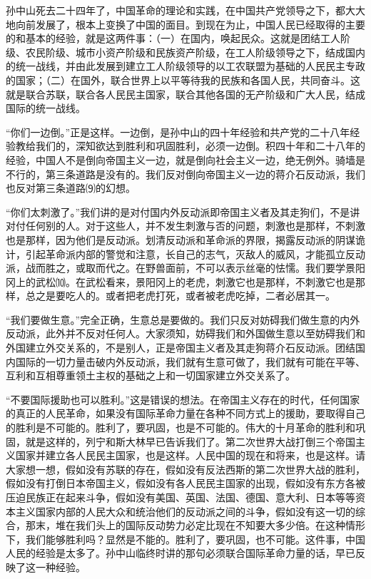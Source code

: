 \documentclass[UTF-8, a5paper, 12pt]{ctexart}
\begin{document}
孙中山死去二十四年了，中国革命的理论和实践，在中国共产党领导之下，都大大地向前发展了，根本上变换了中国的面目。到现在为止，中国人民已经取得的主要的和基本的经验，就是这两件事：（一）在国内，唤起民众。这就是团结工人阶级、农民阶级、城市小资产阶级和民族资产阶级，在工人阶级领导之下，结成国内的统一战线，并由此发展到建立工人阶级领导的以工农联盟为基础的人民民主专政的国家；（二）在国外，联合世界上以平等待我的民族和各国人民，共同奋斗。这就是联合苏联，联合各人民民主国家，联合其他各国的无产阶级和广大人民，结成国际的统一战线。

“你们一边倒。”正是这样。一边倒，是孙中山的四十年经验和共产党的二十八年经验教给我们的，深知欲达到胜利和巩固胜利，必须一边倒。积四十年和二十八年的经验，中国人不是倒向帝国主义一边，就是倒向社会主义一边，绝无例外。骑墙是不行的，第三条道路是没有的。我们反对倒向帝国主义一边的蒋介石反动派，我们也反对第三条道路⑼的幻想。

“你们太刺激了。”我们讲的是对付国内外反动派即帝国主义者及其走狗们，不是讲对付任何别的人。对于这些人，并不发生刺激与否的问题，刺激也是那样，不刺激也是那样，因为他们是反动派。划清反动派和革命派的界限，揭露反动派的阴谋诡计，引起革命派内部的警觉和注意，长自己的志气，灭敌人的威风，才能孤立反动派，战而胜之，或取而代之。在野兽面前，不可以表示丝毫的怯懦。我们要学景阳冈上的武松⑽。在武松看来，景阳冈上的老虎，刺激它也是那样，不刺激它也是那样，总之是要吃人的。或者把老虎打死，或者被老虎吃掉，二者必居其一。

“我们要做生意。”完全正确，生意总是要做的。我们只反对妨碍我们做生意的内外反动派，此外并不反对任何人。大家须知，妨碍我们和外国做生意以至妨碍我们和外国建立外交关系的，不是别人，正是帝国主义者及其走狗蒋介石反动派。团结国内国际的一切力量击破内外反动派，我们就有生意可做了，我们就有可能在平等、互利和互相尊重领土主权的基础之上和一切国家建立外交关系了。

“不要国际援助也可以胜利。”这是错误的想法。在帝国主义存在的时代，任何国家的真正的人民革命，如果没有国际革命力量在各种不同方式上的援助，要取得自己的胜利是不可能的。胜利了，要巩固，也是不可能的。伟大的十月革命的胜利和巩固，就是这样的，列宁和斯大林早已告诉我们了。第二次世界大战打倒三个帝国主义国家并建立各人民民主国家，也是这样。人民中国的现在和将来，也是这样。请大家想一想，假如没有苏联的存在，假如没有反法西斯的第二次世界大战的胜利，假如没有打倒日本帝国主义，假如没有各人民民主国家的出现，假如没有东方各被压迫民族正在起来斗争，假如没有美国、英国、法国、德国、意大利、日本等等资本主义国家内部的人民大众和统治他们的反动派之间的斗争，假如没有这一切的综合，那末，堆在我们头上的国际反动势力必定比现在不知要大多少倍。在这种情形下，我们能够胜利吗？显然是不能的。胜利了，要巩固，也不可能。这件事，中国人民的经验是太多了。孙中山临终时讲的那句必须联合国际革命力量的话，早已反映了这一种经验。
\end{document}
